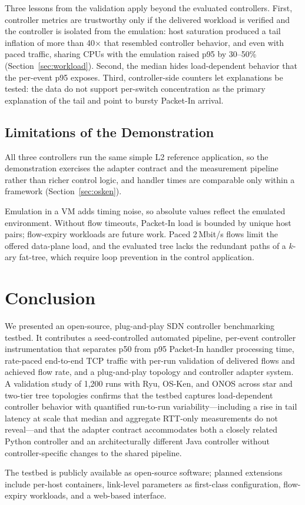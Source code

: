 \documentclass[conference]{IEEEtran}
\begin{document}
Three lessons from the validation apply beyond the evaluated
controllers. First, controller metrics are trustworthy only if the
delivered workload is verified and the controller is isolated from
the emulation: host saturation produced a tail inflation of more
than 40$\times$ that resembled controller behavior, and even with
paced traffic, sharing CPUs with the emulation raised p95 by
30--50\% (Section~\ref{sec:workload}). Second, the median hides
load-dependent behavior that the per-event p95 exposes. Third,
controller-side counters let explanations be tested: the data do
not support per-switch concentration as the primary explanation of
the tail and point to bursty Packet-In arrival.

\subsection{Limitations of the Demonstration}

All three controllers run the same simple L2 reference
application, so the demonstration exercises the adapter contract
and the measurement pipeline rather than richer control logic, and
handler times are comparable only within a framework
(Section~\ref{sec:osken}).

Emulation in a VM adds timing noise, so absolute values reflect
the emulated environment. Without flow timeouts, Packet-In load is
bounded by unique host pairs; flow-expiry workloads are future
work. Paced 2\,Mbit/s flows limit the offered data-plane load, and
the evaluated tree lacks the redundant paths of a $k$-ary
fat-tree, which require loop prevention in the control
application.


\section{Conclusion}
\label{sec:conclusion}

We presented an open-source, plug-and-play SDN controller
benchmarking testbed. It contributes a seed-controlled automated pipeline,
per-event controller instrumentation that separates p50 from p95
Packet-In handler processing time, rate-paced end-to-end TCP
traffic with per-run validation of delivered flows and achieved
flow rate, and a plug-and-play topology and controller adapter
system. A validation study of 1{,}200 runs with Ryu, OS-Ken, and
ONOS across star and two-tier tree topologies confirms that the
testbed captures load-dependent controller behavior with
quantified run-to-run variability---including a rise in tail
latency at scale that median and aggregate RTT-only measurements
do not reveal---and that the adapter contract accommodates both a
closely related Python controller and an architecturally different
Java controller without controller-specific changes to the shared
pipeline.

The testbed is publicly available as open-source software;
planned extensions include per-host containers, link-level
parameters as first-class configuration, flow-expiry workloads,
and a web-based interface.



\end{document}
